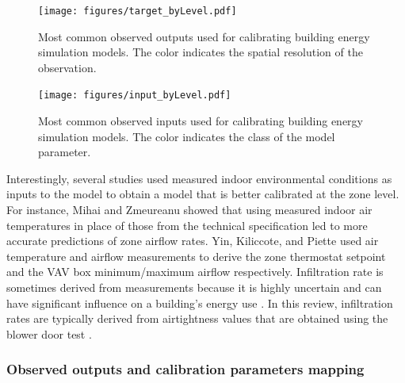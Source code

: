 \documentclass[review]{elsarticle}
\begin{document}
\begin{figure}[!h]
\centering
\texttt{[image: figures/target\_byLevel.pdf]}
\caption{Most common observed outputs used for calibrating building energy simulation models. The color indicates the spatial resolution of the observation.}
\label{fig:target}
\end{figure}

\begin{figure}[!h]
\centering
\texttt{[image: figures/input\_byLevel.pdf]}
\caption{Most common observed inputs used for calibrating building energy simulation models. The color indicates the class of the model parameter.}
\label{fig:input}
\end{figure}

Interestingly, several studies used measured indoor environmental conditions as inputs to the model to obtain a model that is better calibrated at the zone level. For instance, Mihai and Zmeureanu \cite{mihai2017bottom} showed that using measured indoor air temperatures in place of those from the technical specification led to more accurate predictions of zone airflow rates. Yin, Kiliccote, and Piette \cite{yin2016linking} used air temperature and airflow measurements to derive the zone thermostat setpoint and the VAV box minimum/maximum airflow respectively. Infiltration rate is sometimes derived from measurements because it is highly uncertain and can have significant influence on a building's energy use \cite{persily2010modeled}. In this review, infiltration rates are typically derived from airtightness values that are obtained using the blower door test \cite{kim2018model, bandera2017towards, vesterberg2016calibration, ramosruiz2016genetic, roberti2015calibrating, zuhaib2019application, fernandez2020novel, escandon2017assessment}.

\subsubsection{Observed outputs and calibration parameters mapping} \label{sec:output_param}
\end{document}
